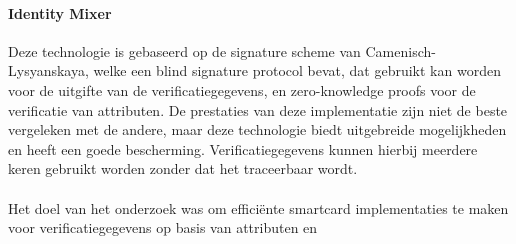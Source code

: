 \paragraph{Identity Mixer}
Deze technologie is gebaseerd op de signature scheme van Camenisch-Lysyanskaya,
welke een blind signature protocol bevat, dat gebruikt kan worden voor de 
uitgifte van de verificatiegegevens, en zero-knowledge proofs voor de 
verificatie van attributen. De prestaties van deze implementatie zijn niet de 
beste vergeleken met de andere, maar deze technologie biedt uitgebreide 
mogelijkheden en heeft een goede bescherming. Verificatiegegevens kunnen 
hierbij meerdere keren gebruikt worden zonder dat het traceerbaar wordt.

\paragraph{}
Het doel van het onderzoek was om efficiënte smartcard implementaties te maken 
voor verificatiegegevens op basis van attributen en

